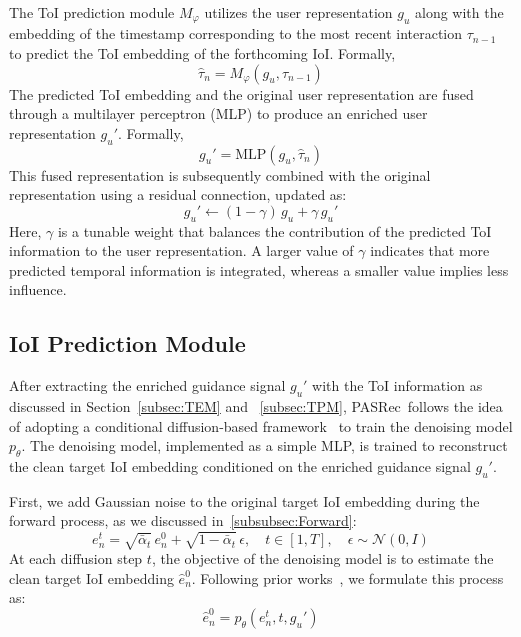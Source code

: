 \documentclass[sigconf,nonacm]{acmart}
\newcommand{\modelname}{PASRec}
\begin{document}
The ToI prediction module \( M_\varphi \) utilizes the user representation \( {g}_u \) along with the embedding of the timestamp corresponding to the most recent interaction \( \tau_{n-1} \) to predict the ToI embedding of the forthcoming IoI. Formally,
\begin{equation}
\hat\tau_{n} = M_\varphi({g}_u, \tau_{n-1})
\end{equation}
The predicted ToI embedding and the original user representation are fused through a multilayer perceptron (MLP) to produce an enriched user representation \( {g}_u' \). Formally,
\begin{equation}
\label{equation_fusion}
{g}_u' = \mathrm{MLP}({g}_u, \hat\tau_{n})
\end{equation}
This fused representation is subsequently combined with the original representation using a residual connection, updated as:
\begin{equation}
{g}_u' \leftarrow (1 - \gamma)\,{g}_u + \gamma\,{g}_u'
\end{equation}
Here, \( \gamma \) is a tunable weight that balances the contribution of the predicted ToI information to the user representation. A larger value of \( \gamma \) indicates that more predicted temporal information is integrated, whereas a smaller value implies less influence.

\subsection{IoI Prediction Module}
\label{subsec:IPM}
After extracting the enriched guidance signal \( {g}_u' \) with the ToI information as discussed in Section~\ref{subsec:TEM} and ~\ref{subsec:TPM}, \modelname\ follows the idea of adopting a conditional diffusion-based framework~\cite{yang2023generate, mao2025distinguished, liu2024preference} to train the denoising model \( p_\theta \). The denoising model, implemented as a simple MLP, is trained to reconstruct the clean target IoI embedding conditioned on the enriched guidance signal \( {g}_u' \).

First, we add Gaussian noise to the original target IoI embedding during the forward process, as we discussed in~\ref{subsubsec:Forward}:
\begin{equation}
e_{n}^{t} = \sqrt{\bar{\alpha}_t} \, e_{n}^{0} + \sqrt{1 - \bar{\alpha}_t} \, {\epsilon}, \quad t \in [1, T], \quad{\epsilon} \sim \mathcal{N}(0, {I})
\end{equation}
At each diffusion step \( t \), the objective of the denoising model is to estimate the clean target IoI embedding \( \hat{e}_{n}^{0} \). Following prior works~\cite{li2023diffurec, yang2023generate, mao2025distinguished, liu2024preference}, we formulate this process as:
\begin{equation}
\label{equation:denoise}
\hat{e}_{n}^{0} = p_\theta(e_{n}^{t}, t, {g}_u')
\end{equation}
\end{document}
